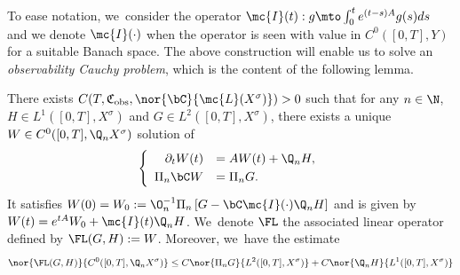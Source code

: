 To ease notation, we~consider the operator $\mc{I}(t): g\mto \int_0^t e^{(t-s)A}g(s)ds$ and we denote $\mc{I}(\cdot)$ when the operator is seen with value in $C^{0}([0,T],Y)$ for a suitable Banach space. The above construction will enable us to solve an \emph{observability Cauchy problem}, which is the content of the following lemma.

\begin{lemma}
\label{lmCauchyobs}
There exists $C(T,\mathfrak{C}_{\textup{obs}},\nor{\bC}{\mc{L}(X^\sigma)})>0$ such that for any $n\in\N$, $H\in L^{1}([0,T],X^{\sigma})$ and $G\in L^{2}([0,T],X^{\sigma})$, there exists a unique $W\in C^{0}([0,T],\Q_{n}X^{\sigma})$ solution of
\begin{align}\label{solprojectlin}
\left\{\begin{array}{rl}
\partial_t W(t)&=AW(t)+\Q_{n}H, \\[3pt]
\Pi_n\bC W &=\Pi_{n}G.
\end{array}\right.
\end{align}
It satisfies $W(0)= W_0:=\O_n^{-1}\Pi_n\left[G-\bC\mc{I}(\cdot)\Q_n H\right]$ and is given by $W(t)=e^{tA}W_{0}+\mc{I}(t)\Q_nH$. We~denote $\FL$ the associated linear operator defined by $\FL(G,H):=W$. Moreover, we~have the estimate
\begin{align}
\label{estimFL}
\nor{\FL(G,H)}{C^{0}([0,T],\Q_{n}X^{\sigma})}\leq C \nor{\Pi_{n}G}{L^{2}([0,T],X^{\sigma})}+C\nor{\Q_{n} H}{L^{1}([0,T],X^{\sigma})}
\end{align}
\end{lemma}
